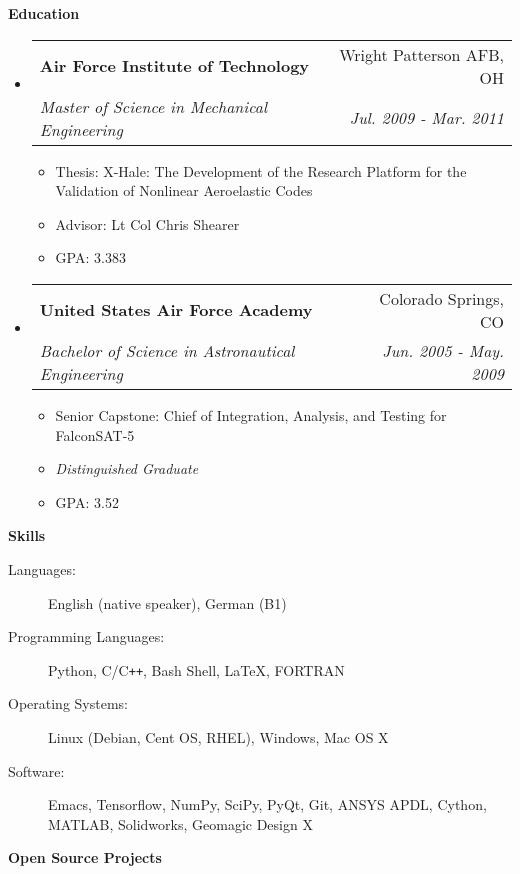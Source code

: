 \documentclass[letterpaper,11pt]{article}
\makeatletter
\newcommand{\resitem}[1]{\item #1 \vspace{-2pt}}
\newcommand{\resheading}[1]{{\large \colorbox{mygrey}{\begin{minipage}{\textwidth}{\textbf{#1 \vphantom{p\^{E}}}}\end{minipage}}}}
\newcommand{\ressubheading}[4]{
\begin{tabular*}{7.0in}{l@{\extracolsep{\fill}}r}
		\textbf{#1} & #2 \\
		\textit{#3} & \textit{#4} \\
\end{tabular*}\vspace{-6pt}}
\makeatother
\begin{document}
\resheading{Education}
\begin{itemize}
\item
  \ressubheading{Air Force Institute of Technology}{Wright Patterson AFB, OH}{Master of Science in Mechanical Engineering}{Jul. 2009 - Mar. 2011}
  \begin{itemize}
    \resitem{Thesis: X-Hale: The Development of the Research Platform for the Validation of Nonlinear Aeroelastic Codes}
    \resitem{Advisor: Lt Col Chris Shearer}
    \resitem{GPA: 3.383}
  \end{itemize}

\item
  \ressubheading{United States Air Force Academy}{Colorado Springs, CO}{Bachelor of Science in Astronautical Engineering}{Jun. 2005 - May. 2009}
  \begin{itemize}
    \resitem{Senior Capstone: Chief of Integration, Analysis, and Testing for FalconSAT-5}
    \resitem{\emph{Distinguished Graduate}}
    \resitem{GPA: 3.52}
  \end{itemize}

\end{itemize}


\resheading{Skills}

\begin{description}
\item [Languages:] English (native speaker), German (B1)
\item[Programming Languages:] Python, C/C{}\verb!++!, Bash Shell, \LaTeX, FORTRAN
\item[Operating Systems:] Linux (Debian, Cent OS, RHEL), Windows, Mac OS X
\item[Software:] Emacs, Tensorflow, NumPy, SciPy, PyQt, Git, ANSYS APDL, Cython, MATLAB, Solidworks, Geomagic Design X
\end{description}

\resheading{Open Source Projects}
\end{document}
